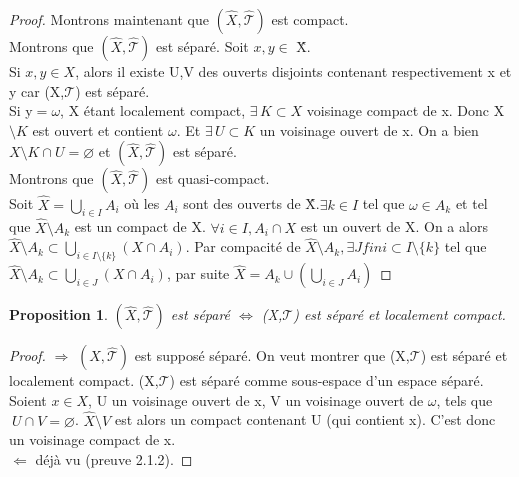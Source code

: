 \documentclass{report}
\theoremstyle{plain}
\newtheorem{proposition}{Proposition}[section]
\newcommand\T{\mathcal{T}}
\begin{document}
        \begin{proof}
			Montrons maintenant que $(\hat{X}, \hat{\T})$ est compact.\\
			Montrons que $(\hat{X}, \hat{\T})$ est séparé. Soit $x,y \in$ \^X.\\
		    Si $x,y \in X$, alors il existe U,V des ouverts disjoints contenant respectivement x et y car (X,$\T$) est séparé.\\
		    Si y$=\omega$, X étant localement compact, $\exists\, K \subset X$ voisinage compact de x. Donc X$\setminus K $ est ouvert et contient $\omega$. Et  $\exists\, U \subset K$ un voisinage ouvert de x. On a bien $X\setminus K    \cap U ={\varnothing}$ et $(\hat{X}, \hat{\T})$ est séparé.\\
		    Montrons que $(\hat{X}, \hat{\T})$ est quasi-compact.\\
		    Soit $\hat{X}=\bigcup\limits_{i\in I} A_i$ où les $A_i$ sont des ouverts de \^X.$\exists k \in I$ tel que $\omega \in A_k$ et tel que $\hat{X}\setminus A_k$ est un compact de X. $\forall i \in I, A_i\cap X$ est un ouvert de X. On a alors $\hat{X}\setminus A_k \subset \bigcup\limits_{i\in I\setminus{\{k\}}} (X \cap A_i)$. Par compacité de $\hat{X}\setminus A_k, \exists J fini \subset I\setminus{\{k\}}$ tel que $\hat{X}\setminus A_k \subset  \bigcup\limits_{i\in J} (X \cap A_i)$, par suite $\hat{X}= A_k \cup (\bigcup\limits_{i\in J} A_i)$
		\end{proof}	
		
		\begin{proposition}
			$(\hat{X}, \hat{\T})$ est séparé $\Longleftrightarrow$ (X,$\T$) est séparé et localement compact.
		\end{proposition}		

		\begin{proof} $\Rightarrow$ $(\hat{X}, \hat{\T})$ est supposé séparé. On veut montrer que (X,$\T$) est séparé et localement compact. (X,$\T$) est séparé comme sous-espace d'un espace séparé. Soient $x \in X$, U un voisinage ouvert de x, V un voisinage ouvert de $\omega$, tels que $\ U \cap V ={\varnothing}$. $\hat{X}\setminus V$ est alors un compact contenant U (qui contient x). C'est donc un voisinage compact de x. \\
		$\Leftarrow$ déjà vu (preuve 2.1.2).
		\end{proof}
\end{document}
